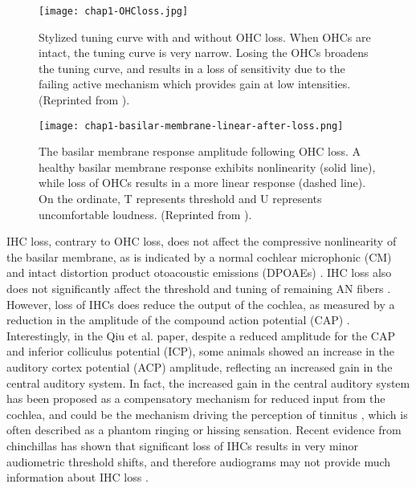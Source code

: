 \begin{figure}[htbp]
\begin{center}
\texttt{[image: chap1-OHCloss.jpg]} \\
\caption[Stylized tuning curve with and without OHC loss.]{Stylized tuning curve with and without OHC loss.  When OHCs are intact, the tuning curve is very narrow.  Losing the OHCs broadens the tuning curve, and results in a loss of sensitivity due to the failing active mechanism which provides gain at low intensities.  (Reprinted from ).}
\label{bm-OHCloss}
\end{center}
\end{figure}

\begin{figure}[htbp]
\begin{center}
\texttt{[image: chap1-basilar-membrane-linear-after-loss.png]} \\
\caption[Linear basilar membrane response following OHC loss]{The basilar membrane response amplitude following OHC loss.  A healthy basilar membrane response exhibits nonlinearity (solid line), while loss of OHCs results in a more linear response (dashed line).  On the ordinate, T represents threshold and U represents uncomfortable loudness. (Reprinted from ).}
\label{bm-after-loss}
\end{center}
\end{figure}

IHC loss, contrary to OHC loss, does not affect the compressive nonlinearity of the basilar membrane, as is indicated by a normal cochlear microphonic (CM) and intact distortion product otoacoustic emissions (DPOAEs) \cite{Trautwein1996}.  IHC loss also does not significantly affect the threshold and tuning of remaining AN fibers \cite{Wang1997}.  However, loss of IHCs does reduce the output of the cochlea, as measured by a reduction in the amplitude of the compound action potential (CAP) \cite{Trautwein1996, Qiu2000}.  Interestingly, in the Qiu et al. paper, despite a reduced amplitude for the CAP and inferior colliculus potential (ICP), some animals showed an increase in the auditory cortex potential (ACP) amplitude, reflecting an increased gain in the central auditory system.  In fact, the increased gain in the central auditory system has been proposed as a compensatory mechanism for reduced input from the cochlea, and could be the mechanism driving the perception of tinnitus \cite{Norena2011}, which is often described as a phantom ringing or hissing sensation.  Recent evidence from chinchillas has shown that significant loss of IHCs results in very minor audiometric threshold shifts, and therefore audiograms may not provide much information about IHC loss \cite{Lobarinas2013}.

